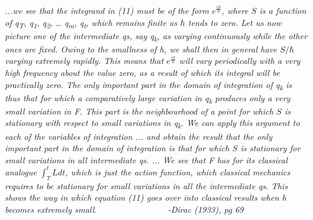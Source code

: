 \documentclass[11pt]{article}
\numberwithin{equation}{section}
\begin{document}
\begin{itemize}
\emph{...we see that the integrand in (11) must be of the form $e^{\frac{iS}{\hbar}}$, where $S$ is a function of \textit{q}\textsubscript{\textit{T}}, \textit{q}\textsubscript{1}, \textit{q}\textsubscript{2}, … \textit{q}\textsubscript{\textit{m}}, \textit{q}\textsubscript{\textit{t}}, which remains finite as $\hbar$   tends to zero. Let us now picture one of the intermediate \textit{q}s, say \textit{q\textsubscript{k}}, as varying continuously while the other ones are fixed. Owing to the smallness of \textit{h}, we shall then in general have $S/\hbar$ varying extremely rapidly. This means that $e^{\frac{iS}{\hbar}}$ will vary periodically with a very high frequency about the value zero, as a result of which its integral will be practically zero. The only important part in the domain of integration of \textit{q\textsubscript{k}} is thus that for which a comparatively large variation in \textit{q\textsubscript{k}} produces only a very small variation in \textit{F}. This part is the neighbourhood of a point for which $S$ is stationary with respect to small variations in \textit{q\textsubscript{k}}. We can apply this argument to each of the variables of integration ... and obtain the result that the only important part in the domain of integration is that for which $S$ is stationary for small variations in all intermediate \textit{q}s. ... We see that \textit{F} has for its classical analogue $\int_T^tLdt$, which is just the action function, which classical mechanics requires to be stationary for small variations in all the intermediate \textit{q}s. This shows the way in which equation (11) goes over into classical results when \textit{h} becomes extremely small. ~~~~~~~~~~~~~~~
-Dirac (1933), pg 69}


\end{itemize}
\end{document}
